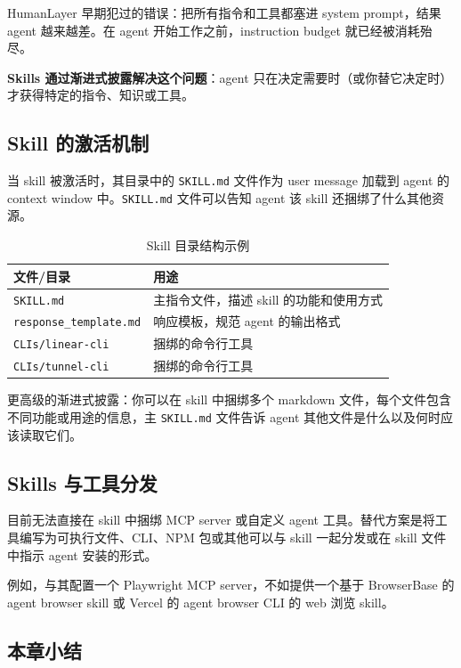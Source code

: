 \documentclass[a4paper]{article}
\begin{document}
HumanLayer 早期犯过的错误：把所有指令和工具都塞进 system prompt，结果 agent 越来越差。在 agent 开始工作之前，instruction budget 就已经被消耗殆尽。

\textbf{Skills 通过渐进式披露解决这个问题}：agent 只在决定需要时（或你替它决定时）才获得特定的指令、知识或工具。

\subsection{Skill 的激活机制}

当 skill 被激活时，其目录中的 \texttt{SKILL.md} 文件作为 user message 加载到 agent 的 context window 中。\texttt{SKILL.md} 文件可以告知 agent 该 skill 还捆绑了什么其他资源。

\begin{table}[H]
\centering
\caption{Skill 目录结构示例}
\begin{tabular}{@{}ll@{}}
\toprule
\textbf{文件/目录} & \textbf{用途} \\
\midrule
\texttt{SKILL.md} & 主指令文件，描述 skill 的功能和使用方式 \\
\texttt{response\_template.md} & 响应模板，规范 agent 的输出格式 \\
\texttt{CLIs/linear-cli} & 捆绑的命令行工具 \\
\texttt{CLIs/tunnel-cli} & 捆绑的命令行工具 \\
\bottomrule
\end{tabular}
\end{table}

更高级的渐进式披露：你可以在 skill 中捆绑多个 markdown 文件，每个文件包含不同功能或用途的信息，主 \texttt{SKILL.md} 文件告诉 agent 其他文件是什么以及何时应该读取它们。

\subsection{Skills 与工具分发}

目前无法直接在 skill 中捆绑 MCP server 或自定义 agent 工具。替代方案是将工具编写为可执行文件、CLI、NPM 包或其他可以与 skill 一起分发或在 skill 文件中指示 agent 安装的形式。

例如，与其配置一个 Playwright MCP server，不如提供一个基于 BrowserBase 的 agent browser skill 或 Vercel 的 agent browser CLI 的 web 浏览 skill。

\subsection{本章小结}
\end{document}
